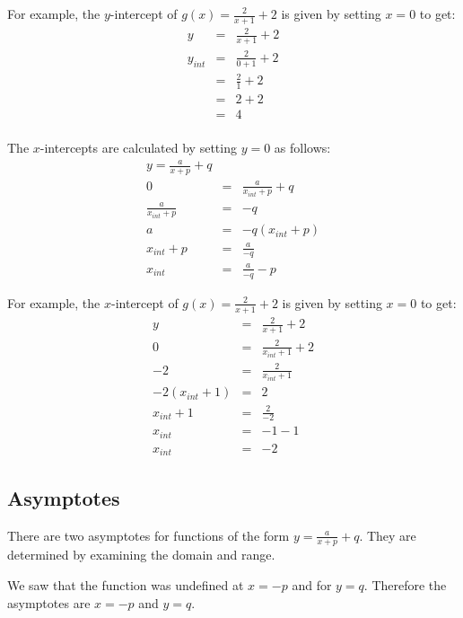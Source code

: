 For example, the $y$-intercept of $g(x)=\frac{2}{x+1} + 2$ is given by setting $x=0$ to get:
\begin{eqnarray*}
y&=&\frac{2}{x+1} + 2\\
y_{int}&=&\frac{2}{0+1} + 2\\
&=&\frac{2}{1} + 2\\
&=&2+ 2\\
&=&4\\
\end{eqnarray*}

The $x$-intercepts are calculated by setting $y=0$ as follows:
\begin{eqnarray}
y=\frac{a}{x+p} + q\\
0&=&\frac{a}{x_{int}+p} + q\\
\frac{a}{x_{int}+p}&=&-q\\
a&=&-q(x_{int}+p)\\
x_{int}+p&=&\frac{a}{-q}\\
x_{int}&=&\frac{a}{-q}-p
\end{eqnarray}

For example, the $x$-intercept of $g(x)=\frac{2}{x+1} + 2$ is given by setting $x=0$ to get:
\begin{eqnarray*}
y&=&\frac{2}{x+1} + 2\\
0&=&\frac{2}{x_{int}+1} + 2\\
-2&=&\frac{2}{x_{int}+1}\\
-2(x_{int}+1)&=&2\\
x_{int}+1&=&\frac{2}{-2}\\
x_{int}&=&-1-1\\
x_{int}&=&-2
\end{eqnarray*}


\subsection{Asymptotes}
There are two asymptotes for functions of the form $y=\frac{a}{x+p} + q$. They are determined by examining the domain and range.

We saw that the function was undefined at $x=-p$ and for $y=q$. Therefore the asymptotes are $x=-p$ and $y=q$.

